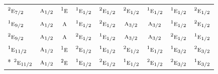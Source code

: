 \documentclass[10pt,a4paper]{article}
\numberwithin{equation}{section}
\newcommand{\irr}[1]{\text{\normalfont\scshape #1}}
\newcommand{\conjpair}[1]{{}^{#1}}
\begin{document}
{\begin{longtable}{@{}lcccccccc@{}}
$\conjpair{2}\irr{e}_{7/2}$ & $\irr{a}_{1/2}$ & $\conjpair{1}\irr{e}$ & $\conjpair{1}\irr{e}_{1/2}$ & $\conjpair{2}\irr{e}_{1/2}$ & $\conjpair{2}\irr{e}_{1/2}$ & $\conjpair{1}\irr{e}_{1/2}$ & $\conjpair{1}\irr{e}_{1/2}$ & $\conjpair{2}\irr{e}_{1/2}$\\
$\conjpair{1}\irr{e}_{9/2}$ & $\irr{a}_{1/2}$ & $\irr{a}$ & $\conjpair{1}\irr{e}_{1/2}$ & $\conjpair{2}\irr{e}_{1/2}$ & $\irr{a}_{3/2}$ & $\irr{a}_{3/2}$ & $\conjpair{1}\irr{e}_{1/2}$ & $\conjpair{2}\irr{e}_{1/2}$\\
$\conjpair{2}\irr{e}_{9/2}$ & $\irr{a}_{1/2}$ & $\irr{a}$ & $\conjpair{2}\irr{e}_{1/2}$ & $\conjpair{1}\irr{e}_{1/2}$ & $\irr{a}_{3/2}$ & $\irr{a}_{3/2}$ & $\conjpair{2}\irr{e}_{1/2}$ & $\conjpair{1}\irr{e}_{1/2}$\\
$\conjpair{1}\irr{e}_{11/2}$ & $\irr{a}_{1/2}$ & $\conjpair{1}\irr{e}$ & $\conjpair{2}\irr{e}_{1/2}$ & $\conjpair{1}\irr{e}_{1/2}$ & $\conjpair{2}\irr{e}_{1/2}$ & $\conjpair{1}\irr{e}_{1/2}$ & $\conjpair{1}\irr{e}_{3/2}$ & $\conjpair{2}\irr{e}_{3/2}$\\*
$\conjpair{2}\irr{e}_{11/2}$ & $\irr{a}_{1/2}$ & $\conjpair{2}\irr{e}$ & $\conjpair{1}\irr{e}_{1/2}$ & $\conjpair{2}\irr{e}_{1/2}$ & $\conjpair{1}\irr{e}_{1/2}$ & $\conjpair{2}\irr{e}_{1/2}$ & $\conjpair{2}\irr{e}_{3/2}$ & $\conjpair{1}\irr{e}_{3/2}$\\
\bottomrule\end{longtable}}
\end{document}
